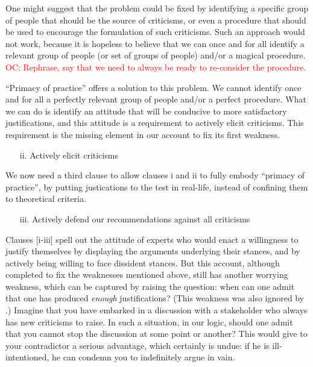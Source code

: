 \documentclass[preprint, french, english, 11pt, authoryear]{elsarticle}%
\newcommand{\commentOC}[1]{\textcolor{red}{OC: #1}}
\begin{document}
One might suggest that the problem could be fixed by identifying a specific group of people that should be the source of criticisms, or even a procedure that should be used to encourage the formulation of such criticisms. Such an approach would not work, because it is hopeless to believe that we can once and for all identify a relevant group of people (or set of groups of people) and/or a magical procedure. \commentOC{Rephrase, say that we need to always be ready to re-consider the procedure.}

``Primacy of practice” offers a solution to this problem. We cannot identify once and for all a perfectly relevant group of people and/or a perfect procedure. What we can do is identify an attitude that will be conducive to more satisfactory justifications, and this attitude is a requirement to actively elicit criticisms. This requirement is the missing element in our account to fix its first weakness.

\begin{itemize}
\item[ii.]	Actively elicit criticisms
\end{itemize}

We now need a third clause to allow clauses i and ii to fully embody “primacy of practice”, by putting justications to the test in real-life, instead of confining them to theoretical criteria.

\begin{itemize}
\item[iii.]	 Actively defend our recommendations against all criticisms
\end{itemize}

Clauses [i-iii] spell out the attitude of experts who would enact a willingness to justify themselves by displaying the arguments underlying their stances, and by actively being willing to face dissident stances. But this account, although completed to fix the weaknesses mentioned above, still has another worrying weakness, which can be captured by raising the question: when can one admit that one has produced \emph{enough} justifications? (This weakness was also ignored by  \citet{meinard_what_2017}.) Imagine that you have embarked in a discussion with a stakeholder who always has new criticisms to raise. In such a situation, in our logic, should one admit that you cannot stop the discussion at some point or another? This would give to your contradictor a serious advantage, which certainly is undue: if he is ill-intentioned, he can condemn you to indefinitely argue in vain.
\end{document}
